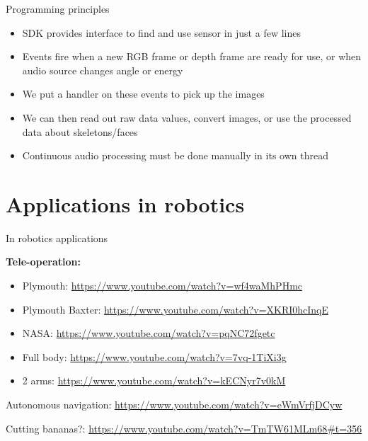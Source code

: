 \documentclass[compress]{beamer}
\begin{document}
\begin{frame}{Programming principles}

\begin{itemize}

\item
  SDK provides interface to find and use sensor in just a few lines
\item
  Events fire when a new RGB frame or depth frame are ready for use, or
  when audio source changes angle or energy
\item
  We put a handler on these events to pick up the images
\item
  We can then read out raw data values, convert images, or use the
  processed data about skeletons/faces
\item
  Continuous audio processing must be done manually in its own thread
\end{itemize}

\end{frame}

\section{Applications in robotics}

\begin{frame}{In robotics applications}

\textbf{Tele-operation:}

\begin{itemize}

\item
  Plymouth: \url{https://www.youtube.com/watch?v=wf4waMhPHmc}
\item
  Plymouth Baxter: \url{https://www.youtube.com/watch?v=XKRI0hcInqE}
\item
  NASA: \url{https://www.youtube.com/watch?v=pqNC72fgetc}
\item
  Full body: \url{https://www.youtube.com/watch?v=7vq-1TiXi3g}
\item
  2 arms: \url{https://www.youtube.com/watch?v=kECNyr7v0kM}
\end{itemize}

Autonomous navigation: \url{https://www.youtube.com/watch?v=eWmVrfjDCyw}

Cutting bananas?:
\url{https://www.youtube.com/watch?v=TmTW61MLm68\#t=356}

\end{frame}
\end{document}
